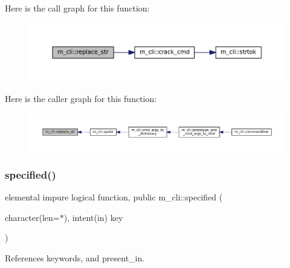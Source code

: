 Here is the call graph for this function\+:
\nopagebreak
\begin{figure}[H]
\begin{center}
\leavevmode
\includegraphics[width=350pt]{namespacem__cli_a40e02b1c9fc580ddd410bb24017fab8c_cgraph}
\end{center}
\end{figure}
Here is the caller graph for this function\+:
\nopagebreak
\begin{figure}[H]
\begin{center}
\leavevmode
\includegraphics[width=350pt]{namespacem__cli_a40e02b1c9fc580ddd410bb24017fab8c_icgraph}
\end{center}
\end{figure}
\mbox{\label{namespacem__cli_a3822e3acc1d6ae296f9f27a83cc1ca23}} 
\subsubsection{\texorpdfstring{specified()}{specified()}}
{\footnotesize\ttfamily elemental impure logical function, public m\+\_\+cli\+::specified (\begin{DoxyParamCaption}\item[{character(len=$\ast$), intent(in)}]{key }\end{DoxyParamCaption})}



References keywords, and present\+\_\+in.

\mbox{\label{namespacem__cli_a0015c38f9fa45a58ba6ae89f2ddb54f1}} 
